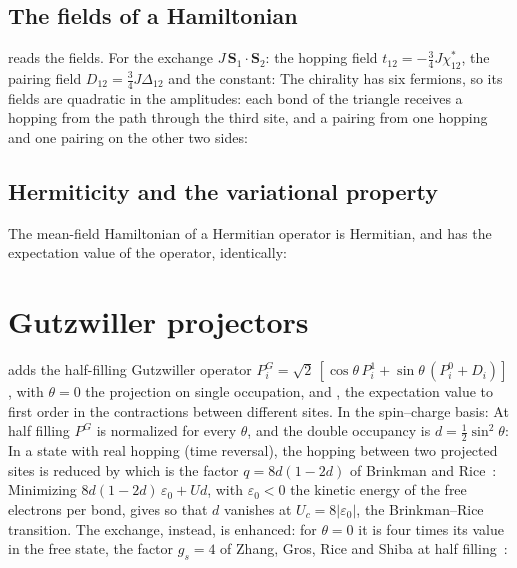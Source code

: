\documentclass[11pt,a4paper]{article}
\begin{document}
\subsection{The fields of a Hamiltonian}
 reads the fields. For the exchange $J\,\mathbf S_1\cdot\mathbf S_2$: the hopping field
$t_{12}=-\frac34J\chi^*_{12}$, the pairing field $D_{12}=\frac34J\Delta_{12}$ and the constant:
The chirality has six fermions, so its fields are quadratic in the amplitudes: each bond of the triangle receives a
hopping from the path through the third site, and a pairing from one hopping and one pairing on the other two sides:

\subsection{Hermiticity and the variational property}
The mean-field Hamiltonian of a Hermitian operator is Hermitian, and has the expectation value of the operator,
identically:

\section{Gutzwiller projectors}\label{sec:gutzwiller}
 adds the half-filling Gutzwiller operator
$P^G_i=\sqrt2\,[\cos\theta\,P^1_i+\sin\theta\,(P^0_i+D_i)]$, with $\theta=0$ the projection on single occupation, and
, the expectation value to first order in the contractions between different sites. In the
spin--charge basis:
At half filling $P^G$ is normalized for every $\theta$, and the double occupancy is $d=\frac12\sin^2\theta$:
In a state with real hopping (time reversal), the hopping between two projected sites is reduced by
which is the factor $q=8d(1-2d)$ of Brinkman and Rice~\cite{BR70}:
Minimizing $8d(1-2d)\,\varepsilon_0+Ud$, with $\varepsilon_0<0$ the kinetic energy of the free electrons per bond, gives
so that $d$ vanishes at $U_c=8|\varepsilon_0|$, the Brinkman--Rice transition. The exchange, instead, is enhanced: for
$\theta=0$ it is four times its value in the free state, the factor $g_s=4$ of Zhang, Gros, Rice and Shiba at half
filling~\cite{ZGRS88}:
\end{document}
